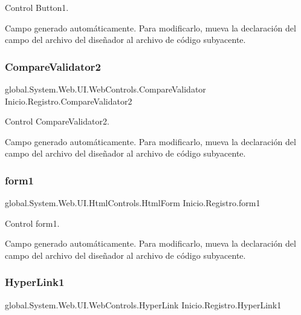 Control Button1. 

Campo generado automáticamente. Para modificarlo, mueva la declaración del campo del archivo del diseñador al archivo de código subyacente. \mbox{\label{class_inicio_1_1_registro_abb680432cdd29ebb5f813036c644dadc}} 
\subsubsection{\texorpdfstring{CompareValidator2}{CompareValidator2}}
{\footnotesize\ttfamily global.\+System.\+Web.\+U\+I.\+Web\+Controls.\+Compare\+Validator Inicio.\+Registro.\+Compare\+Validator2\hspace{0.3cm}{\ttfamily [protected]}}



Control Compare\+Validator2. 

Campo generado automáticamente. Para modificarlo, mueva la declaración del campo del archivo del diseñador al archivo de código subyacente. \mbox{\label{class_inicio_1_1_registro_a0b8d260039acc63632a758544652ea24}} 
\subsubsection{\texorpdfstring{form1}{form1}}
{\footnotesize\ttfamily global.\+System.\+Web.\+U\+I.\+Html\+Controls.\+Html\+Form Inicio.\+Registro.\+form1\hspace{0.3cm}{\ttfamily [protected]}}



Control form1. 

Campo generado automáticamente. Para modificarlo, mueva la declaración del campo del archivo del diseñador al archivo de código subyacente. \mbox{\label{class_inicio_1_1_registro_aa4f71bea88748ad5dfc036a400cb4537}} 
\subsubsection{\texorpdfstring{HyperLink1}{HyperLink1}}
{\footnotesize\ttfamily global.\+System.\+Web.\+U\+I.\+Web\+Controls.\+Hyper\+Link Inicio.\+Registro.\+Hyper\+Link1\hspace{0.3cm}{\ttfamily [protected]}}



